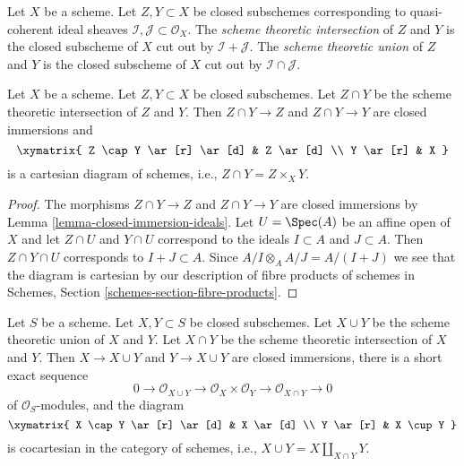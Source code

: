 \begin{definition}
\label{definition-scheme-theoretic-intersection-union}
Let $X$ be a scheme. Let $Z, Y \subset X$ be closed subschemes
corresponding to quasi-coherent ideal sheaves
$\mathcal{I}, \mathcal{J} \subset \mathcal{O}_X$.
The {\it scheme theoretic intersection} of $Z$ and $Y$
is the closed subscheme of $X$ cut out by $\mathcal{I} + \mathcal{J}$.
The {\it scheme theoretic union} of $Z$ and $Y$
is the closed subscheme of $X$ cut out by
$\mathcal{I} \cap \mathcal{J}$.
\end{definition}

\begin{lemma}
\label{lemma-scheme-theoretic-intersection}
Let $X$ be a scheme. Let $Z, Y \subset X$ be closed subschemes.
Let $Z \cap Y$ be the scheme theoretic intersection of $Z$ and $Y$.
Then $Z \cap Y \to Z$ and $Z \cap Y \to Y$ are closed immersions
and
$$
\xymatrix{
Z \cap Y \ar[r] \ar[d] & Z \ar[d] \\
Y \ar[r] & X
}
$$
is a cartesian diagram of schemes, i.e., $Z \cap Y = Z \times_X Y$.
\end{lemma}

\begin{proof}
The morphisms $Z \cap Y \to Z$ and $Z \cap Y \to Y$ are closed immersions
by Lemma \ref{lemma-closed-immersion-ideals}.
Let $U = \Spec(A)$ be an affine open of $X$ and let $Z \cap U$ and $Y \cap U$
correspond to the ideals $I \subset A$ and $J \subset A$. Then
$Z \cap Y \cap U$ corresponds to $I + J \subset A$. Since
$A/I \otimes_A A/J = A/(I + J)$ we see that the diagram is
cartesian by our description of fibre products of schemes
in Schemes, Section \ref{schemes-section-fibre-products}.
\end{proof}

\begin{lemma}
\label{lemma-scheme-theoretic-union}
Let $S$ be a scheme. Let $X, Y \subset S$ be closed subschemes.
Let $X \cup Y$ be the scheme theoretic union of $X$ and $Y$.
Let $X \cap Y$ be the scheme theoretic intersection of $X$ and $Y$.
Then $X \to X \cup Y$ and $Y \to X \cup Y$ are closed immersions, there is a
short exact sequence
$$
0 \to \mathcal{O}_{X \cup Y} \to \mathcal{O}_X \times \mathcal{O}_Y
\to \mathcal{O}_{X \cap Y} \to 0
$$
of $\mathcal{O}_S$-modules, and the diagram
$$
\xymatrix{
X \cap Y \ar[r] \ar[d] & X \ar[d] \\
Y \ar[r] & X \cup Y
}
$$
is cocartesian in the category of schemes, i.e.,
$X \cup Y = X \amalg_{X \cap Y} Y$.
\end{lemma}

